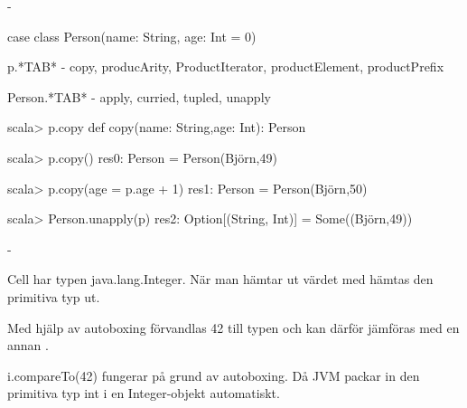 

\ExerciseSolution{\ExeWeekTWELVE}

\BasicTasks %

\Task     %

\Subtask {}

\Subtask {}


\Task     %

\Subtask  {}

\Subtask  -

\Subtask  \begin{Code}
case class Person(name: String, age: Int = 0)
\end{Code}

\Subtask p.*TAB* - copy, producArity, ProductIterator, productElement, productPrefix

Person.*TAB* - apply, curried, tupled, unapply

\begin{REPLnonum}
scala> p.copy
   def copy(name: String,age: Int): Person

scala> p.copy()
res0: Person = Person(Björn,49)

scala> p.copy(age = p.age + 1)
res1: Person = Person(Björn,50)

scala> Person.unapply(p)
res2: Option[(String, Int)] = Some((Björn,49))
\end{REPLnonum}


\Task     %

\Subtask  -

\Subtask  Cell har typen java.lang.Integer. När man hämtar ut värdet med  hämtas den primitiva typ  ut.

\Subtask  Med hjälp av autoboxing förvandlas 42 till typen  och kan därför jämföras med en annan .

\Subtask  i.compareTo(42) fungerar på grund av autoboxing. Då JVM packar in den primitiva typ int i en Integer-objekt automatiskt.

